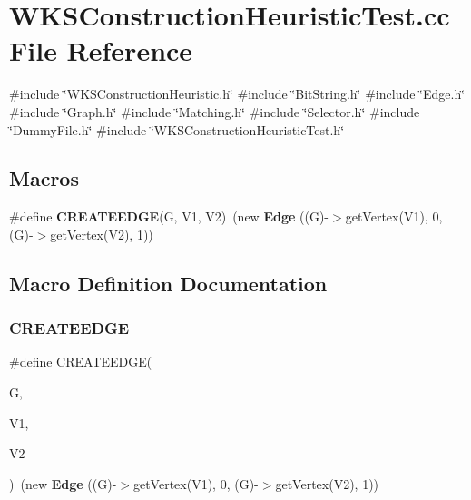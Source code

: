 \section{W\+K\+S\+Construction\+Heuristic\+Test.\+cc File Reference}
\label{WKSConstructionHeuristicTest_8cc}
{\ttfamily \#include \char`\"{}W\+K\+S\+Construction\+Heuristic.\+h\char`\"{}}\newline
{\ttfamily \#include \char`\"{}Bit\+String.\+h\char`\"{}}\newline
{\ttfamily \#include \char`\"{}Edge.\+h\char`\"{}}\newline
{\ttfamily \#include \char`\"{}Graph.\+h\char`\"{}}\newline
{\ttfamily \#include \char`\"{}Matching.\+h\char`\"{}}\newline
{\ttfamily \#include \char`\"{}Selector.\+h\char`\"{}}\newline
{\ttfamily \#include \char`\"{}Dummy\+File.\+h\char`\"{}}\newline
{\ttfamily \#include \char`\"{}W\+K\+S\+Construction\+Heuristic\+Test.\+h\char`\"{}}\newline
\subsection*{Macros}
\begin{DoxyCompactItemize}
\item 
\#define \textbf{ C\+R\+E\+A\+T\+E\+E\+D\+GE}(G,  V1,  V2)~(new \textbf{ Edge} ((G)-\/$>$get\+Vertex(V1), 0, (G)-\/$>$get\+Vertex(V2), 1))
\end{DoxyCompactItemize}


\subsection{Macro Definition Documentation}
\mbox{\label{WKSConstructionHeuristicTest_8cc_a52ddf6d2de5e99f66a5609f59b8f13fd}} 
\subsubsection{C\+R\+E\+A\+T\+E\+E\+D\+GE}
{\footnotesize\ttfamily \#define C\+R\+E\+A\+T\+E\+E\+D\+GE(\begin{DoxyParamCaption}\item[{}]{G,  }\item[{}]{V1,  }\item[{}]{V2 }\end{DoxyParamCaption})~(new \textbf{ Edge} ((G)-\/$>$get\+Vertex(V1), 0, (G)-\/$>$get\+Vertex(V2), 1))}

